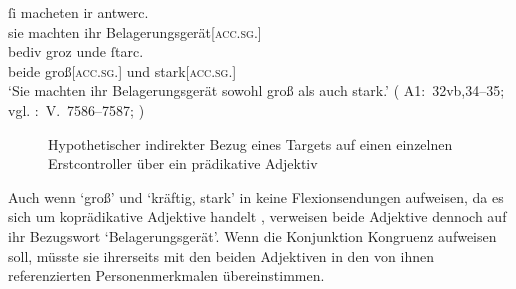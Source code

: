 \begin{exe}
\ex\label{ex:recquery}
	\gll ſi macheten ir antwerc. \\
		sie machten ihr Belagerungsgerät[\textsc{acc.sg.\NeutI}] \\
\sn \gll bediv groz unde ſtarc. \\
		beide groß[\textsc{acc.sg.\NeutI}] und stark[\textsc{acc.sg.\NeutI}] \\
	\trans `Sie machten ihr Belagerungsgerät sowohl groß als auch stark.'
			(%
				A1:~32vb,34--35; vgl.
				\KC:~V.~7586--7587;
				\cite[220]{schroeder1895}%
			)
\end{exe}

\begin{figure}
\caption{Hypothetischer indirekter Bezug eines Targets auf einen einzelnen
	Erstcontroller über ein prädikative Adjektiv}
\label{fig:recquery}
\end{figure}

Auch wenn  `groß' und  `kräftig, stark' in
 keine Flexionsendungen aufweisen,
da es sich um koprädikative Adjektive handelt
\autocite[188]{ksw2}, verweisen beide Adjektive dennoch auf ihr Bezugswort
 `Belagerungsgerät'. Wenn die Konjunktion  Kongruenz
aufweisen soll, müsste sie ihrerseits mit den beiden Adjektiven in den von
ihnen referenzierten Personenmerkmalen übereinstimmen.

